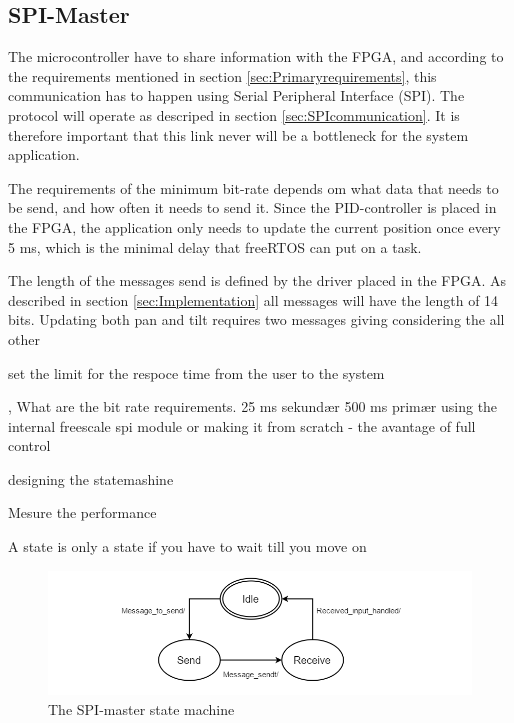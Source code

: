 \subsection{SPI-Master}
\label{sec:SPIMaster}

The microcontroller have to share information with the FPGA, and according to the requirements mentioned in section \ref{sec:Primaryrequirements}, this communication has to happen using Serial Peripheral Interface (SPI). The protocol will operate as descriped in section \ref{sec:SPIcommunication}. It is therefore important that this link never will be a bottleneck for the system application. 

The requirements of the minimum bit-rate depends om what data that needs to be send, and how often it needs to send it. Since the PID-controller is placed in the FPGA, the application only needs to update the current position once every 5 ms, which is the minimal delay that freeRTOS can put on a task. 

The length of the messages send is defined by the driver placed in the FPGA. As described in section \ref{sec:Implementation} all messages will have the length of 14 bits. Updating both pan and tilt requires two messages giving  considering the all other 

set the limit for the respoce time from the user to the system

, What are the bit rate requirements. 
25 ms sekundær
500 ms primær
using the internal freescale spi module or making it from scratch
- the avantage of full control

designing the statemashine

Mesure the performance 



A state is only a state if you have to wait till you move on


\begin{figure}
	\centering
	\includegraphics[scale = 0.7] {Billeder/SPI-master}
	\caption{The SPI-master state machine}
	\label{fig:SPI-master}
\end{figure}



